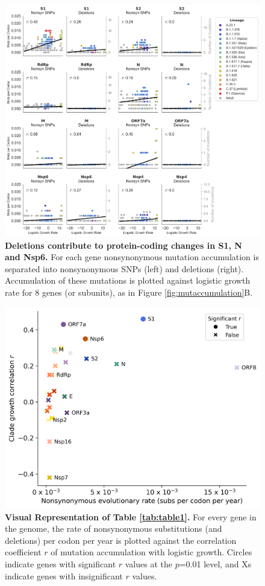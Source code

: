 \documentclass[11pt,oneside,letterpaper]{article}
\begin{document}
\begin{figure}[h!]
	\centerline{\includegraphics[scale=0.5]{fig1_supp_snpdel.png}}
	\caption{\textbf{Deletions contribute to protein-coding changes in S1, N and Nsp6.}
	For each gene nonsynonymous mutation accumulation is separated into nonsynonymous SNPs (left) and deletions (right). Accumulation of these mutations is plotted against logistic growth rate for 8 genes (or subunits), as in Figure \ref{fig:mutaccumulation}B.
	}
	\label{fig:snpdel}
\end{figure}

\begin{figure}[h!]
	\centerline{\includegraphics[scale=0.8]{table1_supp_comprehensive.png}}
	\caption{\textbf{Visual Representation of Table \ref{tab:table1}.}
	For every gene in the genome, the rate of nonsynonymous substitutions (and deletions) per codon per year is plotted against the correlation coefficient $r$ of mutation accumulation with logistic growth. Circles indicate genes with significant $r$ values at the $p$=0.01 level, and Xs indicate genes with insignificant $r$ values.
	}
	\label{fig:4_comprehensive}
\end{figure}
\end{document}
